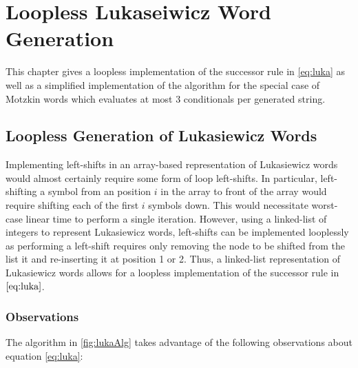 \chapter{Loopless Lukaseiwicz Word Generation}
This chapter gives a loopless implementation of the successor rule in \ref{eq:luka} as well as a simplified implementation of the algorithm for the special case of Motzkin words which evaluates at most 3 conditionals per generated string. 


\section{Loopless Generation of Lukasiewicz Words}
Implementing left-shifts in an array-based representation of Lukasiewicz words would almost certainly require some form of loop left-shifts.  In particular, left-shifting a symbol from an position $i$ in the array to front of the array would require shifting each of the first $i$ symbols down.  This would necessitate worst-case linear time to perform a single iteration. 
However, using a linked-list of integers to represent Lukasiewicz words, left-shifts can be implemented looplessly as performing a left-shift requires only removing the node to be shifted from the list it and re-inserting it at position 1 or 2.  Thus, a linked-list representation of Lukasiewicz words allows for a loopless implementation of the successor rule in $\ref{eq:luka}$.

\subsection{Observations}
The algorithm in \ref{fig:lukaAlg} takes advantage of the following observations about equation \ref{eq:luka}:

